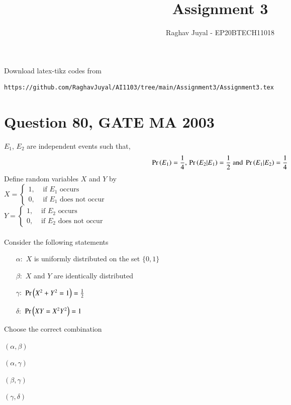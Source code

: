 \documentclass[journal,12pt,twocolumn]{IEEEtran}
\begin{document}
\let\vec\mathbf
\renewcommand{\thefigure}{\theproblem}
\def\putbox#1#2#3{\makebox[0in][l]{\makebox[#1][l]{}\raisebox{\baselineskip}[0in][0in]{\raisebox{#2}[0in][0in]{#3}}}}
     \def\rightbox#1{\makebox[0in][r]{#1}}
     \def\centbox#1{\makebox[0in]{#1}}
     \def\topbox#1{\raisebox{-\baselineskip}[0in][0in]{#1}}
     \def\midbox#1{\raisebox{-0.5\baselineskip}[0in][0in]{#1}}
\vspace{3cm}
\title{Assignment 3}
\author{Raghav Juyal - EP20BTECH11018}
\maketitle
\newpage
\bigskip
\renewcommand{\thefigure}{\theenumi}
\renewcommand{\thetable}{\theenumi}
Download latex-tikz codes from 
%
\begin{lstlisting}
https://github.com/RaghavJuyal/AI1103/tree/main/Assignment3/Assignment3.tex
\end{lstlisting}
\section*{Question 80, GATE MA 2003}
$E_1$, $E_2$ are independent events such that,
\begin{align*}
    \Pr\left(E_1\right) = \frac{1}{4},\,\Pr\left(E_2|E_1\right) = \frac{1}{2} \text{ and } \Pr\left(E_1|E_2\right) = \frac{1}{4}
\end{align*}
Define random variables $X$ and $Y$ by\\
$X=
\begin{cases}
1, &\text{ if $E_1$ occurs}\\
0, &\text{ if $E_1$ does not occur}
\end{cases}$
\\$Y=
\begin{cases}
1, &\text{ if $E_2$ occurs}\\
0, &\text{ if $E_2$ does not occur}
\end{cases}$
\\\\
Consider the following statements
\begin{itemize}
    \item[$\alpha:$]$X$ is uniformly distributed on the set $\{0,1\}$
    \item[$\beta:$]$X$ and $Y$ are identically distributed
    \item[$\gamma:$]$\Pr\left(X^2 + Y^2 = 1\right) = \frac{1}{2}$
    \item[$\delta:$]$\Pr\left(XY=X^2Y^2\right) = 1$
\end{itemize}
Choose the correct combination
\begin{enumerate}[label = (\alph*)]
\begin{multicols}{2}
\setlength\itemsep{2em}
    \item $(\alpha,\beta)$
    \item $(\alpha,\gamma)$
    \item $(\beta,\gamma)$
    \item $(\gamma,\delta)$
\end{multicols}
\end{enumerate}
\end{document}
